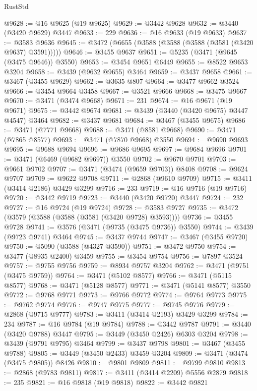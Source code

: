 \begin{lexlean}{RustStd}
\begin{coremodule}
{{{{{{{{{{{{{{{{{{{@9628 := @16 @9625 (@19 @9625)
@9629 := @3442 @9628
@9632 := @3440 (@3420 @9629) @3447
@9633 := 229
@9636 := @16 @9633 (@19 @9633)
@9637 := @3583 @9636
@9645 := @3472 (@6655 (@3588 (@3588 (@3588 (@3581 (@3420 @9637) @3591)))))
@9646 := @3455 @9637
@9651 := @5235 (@3471 (@9645 (@3475 @9646)) @3550)
@9653 := @3454 @9651 @6449
@9655 := @8522 @9653 @3204
@9658 := @3439 (@9632 @9655) @3464
@9659 := @3437 @9658
@9661 := @3467 (@3455 @9629)
@9662 := @3635 @807
@9664 := @3477 @9662 @3524
@9666 := @3454 @9664 @3458
@9667 := @3521 @9666
@9668 := @3475 @9667
@9670 := @3471 (@3474 @9668)
@9671 := 231
@9674 := @16 @9671 (@19 @9671)
@9675 := @3442 @9674
@9681 := @3439 (@3440 (@3420 @9675) @3447 @4547) @3464
@9682 := @3437 @9681
@9684 := @3467 (@3455 @9675)
@9686 := @3471 (@7771 @9668)
@9688 := @3471 (@8581 @9668)
@9690 := @3471 (@7865 @8577)
@9693 := @3471 (@7870 @9668) @3550
@9694 := @9690 @9693
@9695 := @9688 @9694
@9696 := @9686 @9695
@9697 := @9684 @9696
@9701 := @3471 (@6469 (@9682 @9697)) @3550
@9702 := @9670 @9701
@9703 := @9661 @9702
@9707 := @3471 (@3474 (@9659 @9703)) @8408
@9708 := @9624 @9707
@9709 := @9622 @9708
@9711 := @2868 (@9610 @9709)
@9715 := @3411 (@3414 @2186) @3429 @3299
@9716 := 233
@9719 := @16 @9716 (@19 @9716)
@9720 := @3442 @9719
@9723 := @3440 (@3420 @9720) @3447
@9724 := 232
@9727 := @16 @9724 (@19 @9724)
@9728 := @3583 @9727
@9735 := @3472 (@3579 (@3588 (@3588 (@3581 (@3420 @9728) @3593))))
@9736 := @3455 @9728
@9741 := @3576 (@3471 (@9735 (@3475 @9736)) @3550)
@9744 := @3439 (@9723 @9741) @3464
@9745 := @3437 @9744
@9747 := @3467 (@3455 @9720)
@9750 := @5090 (@3588 (@4327 @3590))
@9751 := @3472 @9750
@9754 := @3477 (@8935 @2400) @3459
@9755 := @3454 @9754
@9756 := @7897 @3524
@9757 := @9755 @9756
@9759 := @8934 @9757 @3204
@9762 := @3471 (@9751 (@3475 @9759))
@9764 := @3471 (@5102 @8577)
@9766 := @3471 (@5115 @8577)
@9768 := @3471 (@5128 @8577)
@9771 := @3471 (@5141 @8577) @3550
@9772 := @9768 @9771
@9773 := @9766 @9772
@9774 := @9764 @9773
@9775 := @9762 @9774
@9776 := @9747 @9775
@9777 := @9745 @9776
@9779 := @2868 (@9715 @9777)
@9783 := @3411 (@3414 @2193) @3429 @3299
@9784 := 234
@9787 := @16 @9784 (@19 @9784)
@9788 := @3442 @9787
@9791 := @3440 (@3420 @9788) @3447
@9795 := @3449 (@3450 @2426) @6303 @3204
@9798 := @3439 (@9791 @9795) @3464
@9799 := @3437 @9798
@9801 := @3467 (@3455 @9788)
@9805 := @3449 (@3450 @2433) @3459 @3204
@9809 := @3471 (@3474 (@3475 @9805)) @8426
@9810 := @9801 @9809
@9811 := @9799 @9810
@9813 := @2868 (@9783 @9811)
@9817 := @3411 (@3414 @2209) @5556 @2879
@9818 := 235
@9821 := @16 @9818 (@19 @9818)
@9822 := @3442 @9821
}}}}}}}}}}}}}}}}}}}
\end{coremodule}
\end{lexlean}
